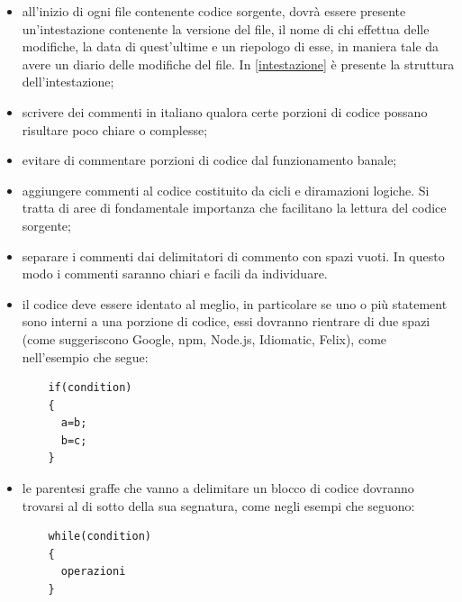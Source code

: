  \begin{itemize}
 	\item all'inizio di ogni file contenente codice sorgente, dovrà essere presente un'intestazione contenente la versione del file, il nome di chi effettua delle modifiche, la data di quest'ultime e un riepologo di esse, in maniera tale da avere un diario delle modifiche del file. In \ref{intestazione} è presente la struttura dell'intestazione;
 	\item scrivere dei commenti in italiano qualora certe porzioni di codice possano risultare poco chiare o complesse;
 	\item evitare di commentare porzioni di codice dal funzionamento banale;
 	\item aggiungere commenti al codice costituito da cicli e diramazioni logiche. Si tratta di aree
 	di fondamentale importanza che facilitano la lettura del codice sorgente;
 	\item separare i commenti dai delimitatori di commento con spazi vuoti. In questo modo i
 	commenti saranno chiari e facili da individuare.
 	\item il codice deve essere identato al meglio, in particolare se uno o più statement sono interni a una porzione di codice, essi dovranno rientrare di due spazi (come suggeriscono Google, npm, Node.js, Idiomatic, Felix), come nell'esempio che segue: \begin{lstlisting}
 	if(condition)
 	{
 	  a=b;
 	  b=c;
 	}
 	\end{lstlisting}
 	\item le parentesi graffe che vanno a delimitare un blocco di codice dovranno trovarsi al di sotto della sua segnatura, come negli esempi che seguono:
 	\begin{lstlisting}
 	while(condition)
 	{
 	  operazioni
 	}


\end{lstlisting}
\end{itemize}
